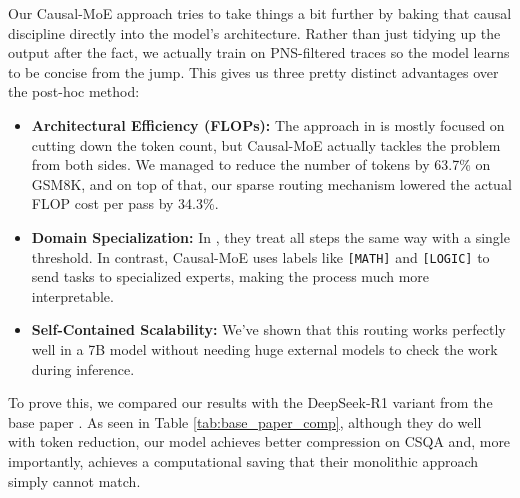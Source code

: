 \documentclass[conference,compsoc]{IEEEtran}
\begin{document}
Our Causal-MoE approach tries to take things a bit further by baking that causal discipline directly into the model's architecture. Rather than just tidying up the output after the fact, we actually train on PNS-filtered traces so the model learns to be concise from the jump. This gives us three pretty distinct advantages over the post-hoc method:
\begin{itemize}
    \item \textbf{Architectural Efficiency (FLOPs):} The approach in \cite{b7} is mostly focused on cutting down the token count, but Causal-MoE actually tackles the problem from both sides. We managed to reduce the number of tokens by 63.7\% on GSM8K, and on top of that, our sparse routing mechanism lowered the actual FLOP cost per pass by 34.3\%.
    \item \textbf{Domain Specialization:} In \cite{b7}, they treat all steps the same way with a single threshold. In contrast, Causal-MoE uses labels like \texttt{[MATH]} and \texttt{[LOGIC]} to send tasks to specialized experts, making the process much more interpretable.
    \item \textbf{Self-Contained Scalability:} We've shown that this routing works perfectly well in a 7B model without needing huge external models to check the work during inference.
\end{itemize}

To prove this, we compared our results with the DeepSeek-R1 variant from the base paper \cite{b7}. As seen in Table \ref{tab:base_paper_comp}, although they do well with token reduction, our model achieves better compression on CSQA and, more importantly, achieves a computational saving that their monolithic approach simply cannot match.

\begin{table}[htbp]
\caption{Comparison with results from Yu et al. \cite{b7}}
\label{tab:base_paper_comp}
\centering
\renewcommand{\arraystretch}{1.2}
\end{table}
\end{document}
